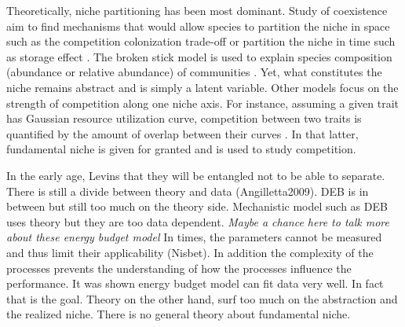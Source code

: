 Theoretically, niche partitioning has been most dominant.
Study of coexistence aim to find mechanisms that would allow species to partition the niche in space such as the competition colonization trade-off \citep[e.g.,][]{Levins1971,Tilman1994} or partition the niche in time such as storage effect \citep{Skellam1951, Chesson2000}. %
The broken stick model is used to explain species composition (abundance or relative abundance) of communities \citep{MacArthur1957}.
Yet, what constitutes the niche remains abstract and is simply a latent variable.
Other models focus on the strength of competition along one niche axis.
For instance, assuming a given trait has Gaussian resource utilization curve, competition  between two traits is quantified by the amount of overlap between their curves \citep{MacArthur1967, Roughgarden1979}.%
In that latter, fundamental niche is given for granted and is used to study competition.

In the early age, Levins that they will be entangled not to be able to separate.
There is still a divide between theory and data (Angilletta2009).
DEB is in between but still too much on the theory side.
Mechanistic model such as DEB uses theory but they are too data dependent.
\textit{Maybe a chance here to talk more about these energy budget model}
In times, the parameters cannot be measured and thus limit their applicability (Nisbet).
In addition the complexity of the processes prevents the understanding of how the processes influence the performance.
It was shown energy budget model can fit data very well.
In fact that is the goal.
Theory on the other hand, surf too much on the abstraction and the realized niche.
There is no general theory about fundamental niche.

